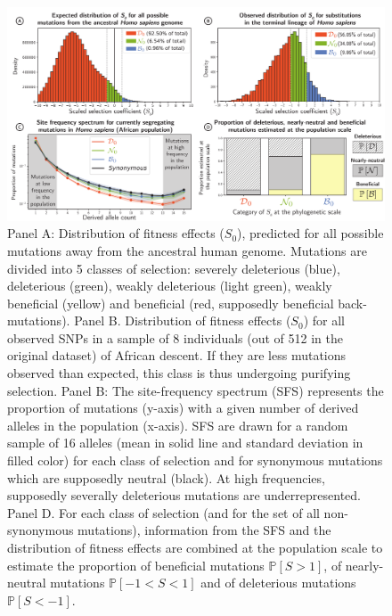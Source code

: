 \documentclass{article}
\newcommand{\proba}{\mathbb{P}}
\newcommand{\Sphy}{S_{0}}
\newcommand{\Spop}{S}
\newcommand{\polyDel}{\Spop < -1}
\newcommand{\polyNeutral}{-1 < \Spop < 1}
\newcommand{\polyAdv}{ \Spop > 1}
\newcommand{\PpolyDel}{\proba \left[ \polyDel \right]}
\newcommand{\PpolyNeutral}{\proba \left[ \polyNeutral \right]}
\newcommand{\PpolyAdv}{\proba \left[ \polyAdv \right]}
\begin{document}
    \begin{figure}[!ht]
        \centering
        \includegraphics[width=\textwidth, page=1] {artworks/figure.homo-afr-results}
        \caption{
            Panel A: Distribution of fitness effects ($\Sphy$), predicted for all possible mutations away from the ancestral human genome.
            Mutations are divided into 5 classes of selection: severely deleterious (blue), deleterious (green), weakly deleterious (light green), weakly beneficial (yellow) and beneficial (red, supposedly beneficial back-mutations).
            Panel B. Distribution of fitness effects ($\Sphy$) for all observed SNPs in a sample of 8 individuals (out of 512 in the original dataset) of African descent.
            If they are less mutations observed than expected, this class is thus undergoing purifying selection.
            Panel B: The site-frequency spectrum (SFS) represents the proportion of mutations (y-axis) with a given number of derived alleles in the population (x-axis).
            SFS are drawn for a random sample of 16 alleles (mean in solid line and standard deviation in filled color) for each class of selection and for synonymous mutations which are supposedly neutral (black).
            At high frequencies, supposedly severally deleterious mutations are underrepresented.
            Panel D. For each class of selection (and for the set of all non-synonymous mutations), information from the SFS and the distribution of fitness effects are combined at the population scale to estimate the proportion of beneficial mutations $\PpolyAdv$, of nearly-neutral mutations $\PpolyNeutral$ and of deleterious mutations $\PpolyDel$.
        }
        \label{fig:homo-afr-results}
    \end{figure}
\end{document}
